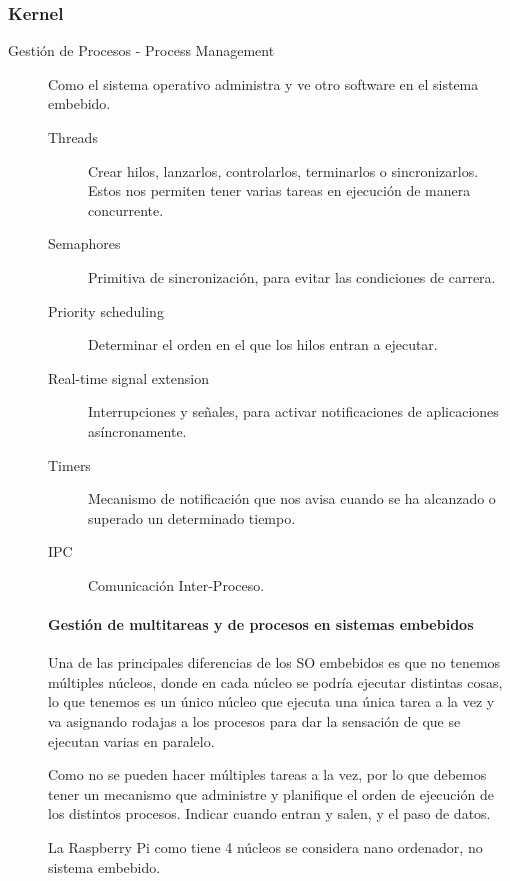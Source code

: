 \documentclass[12pt, twoside, openright]{report} %
\begin{document}
\subsubsection{Kernel}

\begin{description}
	\item[Gestión de Procesos - Process Management] Como el sistema operativo administra y ve otro software en el sistema embebido.

	      \begin{description}
		      \item[Threads] Crear hilos, lanzarlos, controlarlos, terminarlos o sincronizarlos. Estos nos permiten tener varias tareas en ejecución de manera concurrente.
		      \item[Semaphores] Primitiva de sincronización, para evitar las condiciones de carrera.
		      \item[Priority scheduling] Determinar el orden en el que los hilos entran a ejecutar.
		      \item[Real-time signal extension] Interrupciones y señales, para activar notificaciones de aplicaciones asíncronamente.
		      \item[Timers] Mecanismo de notificación que nos avisa cuando se ha alcanzado o superado un determinado tiempo.
		      \item[IPC] Comunicación Inter-Proceso.
	      \end{description}

	      \paragraph{Gestión de multitareas y de procesos en sistemas embebidos}

	      Una de las principales diferencias de los SO embebidos es que no tenemos múltiples núcleos, donde en cada núcleo se podría ejecutar distintas cosas, lo que tenemos es un único núcleo que ejecuta una única tarea a la vez y va asignando rodajas a los procesos para dar la sensación de que se ejecutan varias en paralelo.

	      Como no se pueden hacer múltiples tareas a la vez, por lo que debemos tener un mecanismo que administre y planifique el orden de ejecución de los distintos procesos. Indicar cuando entran y salen, y el paso de datos.

	      La Raspberry Pi como tiene 4 núcleos se considera nano ordenador, no sistema embebido.



\end{description}
\end{document}
